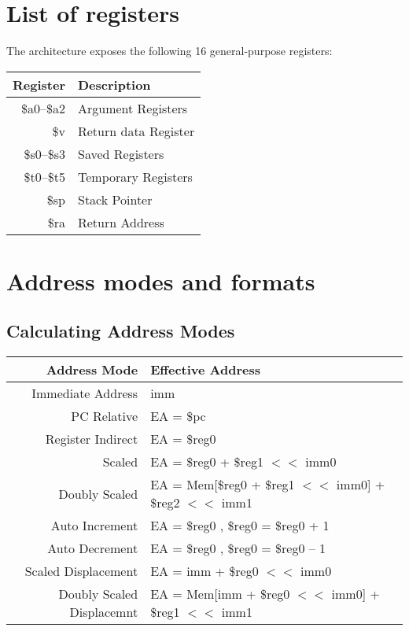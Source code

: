 \documentclass[12pt]{article}
\begin{document}
\section{List of registers}
The architecture exposes the following 16 general-purpose registers:

\vspace{6pt}
\begin{tabular}{| r | l |}
\hline
\textbf{Register} & \textbf{Description}\\
\hline
\$a0--\$a2 & Argument Registers\\
\$v & Return data Register\\
\$s0--\$s3 & Saved Registers\\
\$t0--\$t5 & Temporary Registers\\
\$sp & Stack Pointer\\
\$ra & Return Address\\ 
\hline
\end {tabular}

\section{Address modes and formats}
\subsection{Calculating Address Modes}
\begin{tabular}{| r | l |}
\hline
\textbf{Address Mode} & \textbf {Effective Address} \\
\hline
Immediate Address & imm\\
PC Relative & EA = \$pc \\
Register Indirect & EA = \$reg0\\
Scaled & EA = \$reg0 + \$reg1 $<<$ imm0\\
Doubly Scaled & EA = Mem[\$reg0 + \$reg1 $<<$ imm0] + \$reg2 $<<$ imm1 \\
Auto Increment & EA = \$reg0 , \$reg0 = \$reg0 + 1\\
Auto Decrement & EA = \$reg0 , \$reg0 = \$reg0 -- 1\\
Scaled Displacement & EA = imm + \$reg0 $<<$ imm0\\
Doubly Scaled Displacemnt & EA = Mem[imm + \$reg0 $<<$ imm0] + \$reg1 $<<$ imm1\\
\hline
\end{tabular}
\end{document}
